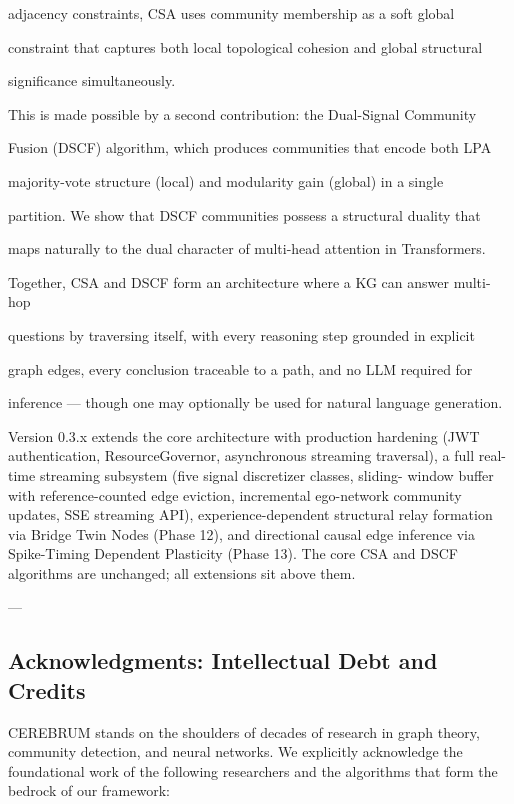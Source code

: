 \documentclass[10pt,journal,compsoc]{IEEEtran}
\begin{document}
adjacency constraints, CSA uses community membership as a soft global

constraint that captures both local topological cohesion and global structural

signi\-ficance simul\-taneously.

This is made possible by a second contr\-ibution: the \textit{}Dual-Signal Community

Fusion (DSCF)\textit{} algorithm, which produces communities that encode both LPA

majority-vote structure (local) and modularity gain (global) in a single

partition. We show that DSCF communities possess a structural duality that

maps naturally to the dual character of multi-head attention in Transf\-ormers.

Together, CSA and DSCF form an archi\-tecture where a KG can answer multi-hop

questions by traversing itself, with every reasoning step grounded in explicit

graph edges, every conclusion traceable to a path, and no LLM required for

inference — though one may optionally be used for natural language generation.

Version 0.3.x extends the core archi\-tecture with production hardening (JWT
authe\-ntication, ResourceGovernor, async\-hronous streaming traversal), a
full real-time streaming subsystem (five signal discretizer classes, sliding-
window buffer with reference-counted edge eviction, incremental ego-network
community updates, SSE streaming API), experience-dependent structural relay
formation via Bridge Twin Nodes (Phase 12), and directional causal edge
inference via Spike-Timing Dependent Plasticity (Phase 13). The core CSA and
DSCF algorithms are unchanged; all extensions sit above them.

---

\subsection{Acknow\-ledgments: Intell\-ectual Debt and Credits}

CEREBRUM stands on the shoulders of decades of research in graph theory, community detection, and neural networks. We explicitly acknowledge the found\-ational work of the following researchers and the algorithms that form the bedrock of our framework:
\end{document}
